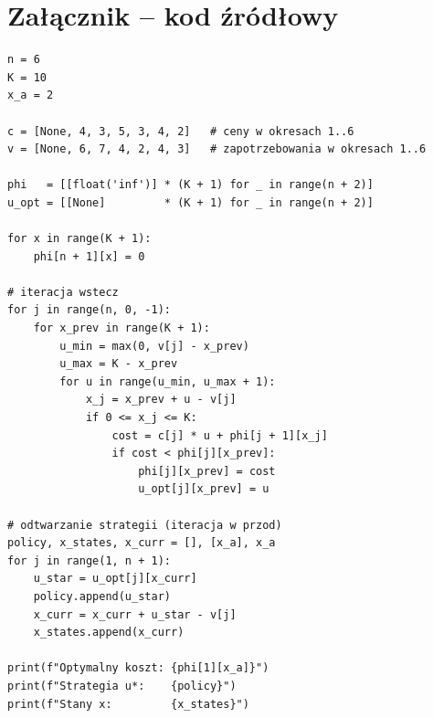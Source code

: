\documentclass[12pt,a4paper]{article}
\begin{document}
\section{Za\l{}\k{a}cznik -- kod \'zr\'od\l{}owy}

\begin{lstlisting}[style=pythonstyle, caption={Wyznaczanie optymalnej strategii zakupu -- przyk\l{}ad 18.3.6.1}]
n = 6
K = 10
x_a = 2

c = [None, 4, 3, 5, 3, 4, 2]   # ceny w okresach 1..6
v = [None, 6, 7, 4, 2, 4, 3]   # zapotrzebowania w okresach 1..6

phi   = [[float('inf')] * (K + 1) for _ in range(n + 2)]
u_opt = [[None]         * (K + 1) for _ in range(n + 2)]

for x in range(K + 1):
    phi[n + 1][x] = 0

# iteracja wstecz
for j in range(n, 0, -1):
    for x_prev in range(K + 1):
        u_min = max(0, v[j] - x_prev)
        u_max = K - x_prev
        for u in range(u_min, u_max + 1):
            x_j = x_prev + u - v[j]
            if 0 <= x_j <= K:
                cost = c[j] * u + phi[j + 1][x_j]
                if cost < phi[j][x_prev]:
                    phi[j][x_prev] = cost
                    u_opt[j][x_prev] = u

# odtwarzanie strategii (iteracja w przod)
policy, x_states, x_curr = [], [x_a], x_a
for j in range(1, n + 1):
    u_star = u_opt[j][x_curr]
    policy.append(u_star)
    x_curr = x_curr + u_star - v[j]
    x_states.append(x_curr)

print(f"Optymalny koszt: {phi[1][x_a]}")
print(f"Strategia u*:    {policy}")
print(f"Stany x:         {x_states}")
\end{lstlisting}
\end{document}
